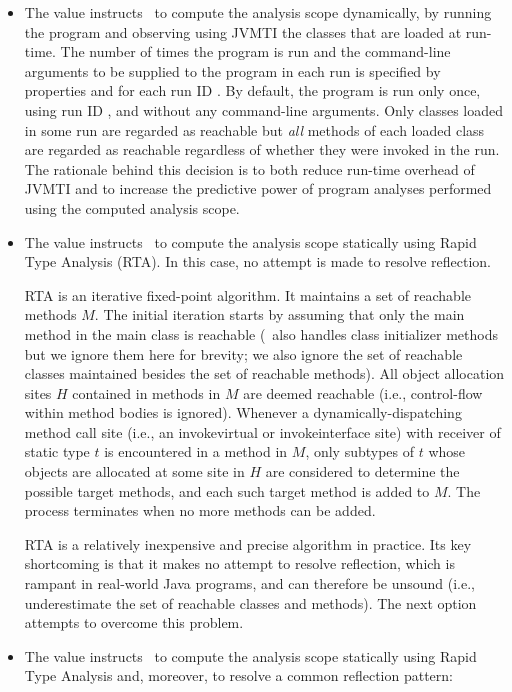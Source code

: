 \begin{itemize}
\begin{itemize}
\item
The  value instructs \Chord\ to compute the analysis scope dynamically, by running the program
and observing using JVMTI the classes that are loaded at run-time.
The number of times the program is run and the command-line arguments to be supplied to
the program in each run is specified by properties  and
 for each run ID .  By default, the program is run only once, using run ID ,
and without any command-line arguments.
Only classes loaded in some run are regarded as reachable but {\it all} methods of each loaded class are regarded
as reachable regardless of whether they were invoked in the run.
The rationale behind this decision is to both reduce run-time overhead of JVMTI and to increase the
predictive power of program analyses performed using the computed analysis scope.

\item
The  value instructs \Chord\ to compute the analysis scope statically using Rapid Type Analysis (RTA).
In this case, no attempt is made to resolve reflection.

RTA is an iterative fixed-point algorithm.  It maintains a set of reachable methods $M$.
The initial iteration starts by assuming that only the main method in the main class is reachable
(\Chord\ also handles class initializer methods but we ignore them here for brevity; we also ignore
the set of reachable classes maintained besides the set of reachable methods).
All object allocation sites $H$ contained in methods in $M$ are deemed
reachable (i.e., control-flow within method bodies is ignored).  Whenever a dynamically-dispatching
method call site (i.e., an invokevirtual or invokeinterface site) with receiver of static
type $t$ is encountered in a method in $M$, only subtypes of $t$ whose objects are allocated at some site in $H$
are considered to determine the possible target methods, and each such target
method is added to $M$.  The process terminates when no more methods can be added.

RTA is a relatively inexpensive and precise algorithm in practice.  Its key shortcoming is that it makes
no attempt to resolve reflection, which is rampant in real-world Java programs, and can therefore be
unsound (i.e., underestimate the set of reachable classes and methods).
The next option attempts to overcome this problem.

\item
The  value instructs \Chord\ to compute the analysis scope statically using Rapid Type Analysis
and, moreover, to resolve a common reflection pattern:


\end{itemize}
\end{itemize}
